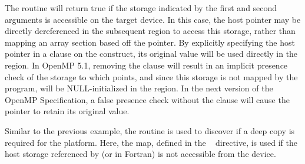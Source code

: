 The  routine will return true if the storage indicated 
by the first and second arguments is accessible on the target device. In this case, 
the host pointer  may be directly dereferenced in the subsequent 
 region to access this storage, rather than mapping an array section based 
off the pointer. By explicitly specifying the host pointer in a  
clause on the construct, its original value will be used directly in the  region. 
In OpenMP 5.1, removing the  clause will result in an implicit presence 
check of the storage to which  points, and since this storage is not mapped by the 
program,  will be NULL-initialized in the  region. 
In the next version of the OpenMP Specification, a false presence check without 
the  clause will cause the pointer to retain its original value. 


Similar to the previous example, the  routine is used to
discover if a deep copy is required for the platform.  Here, the  map,
defined in the ~ directive, is used if the host storage referenced by 
 (or  in Fortran) is not accessible from the device.

